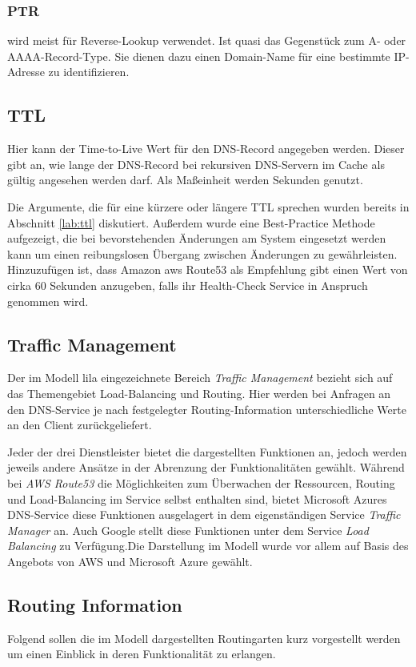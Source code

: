 \subsubsection{PTR}
wird meist für Reverse-Lookup verwendet. Ist quasi das Gegenstück zum A- oder AAAA-Record-Type. Sie dienen dazu einen Domain-Name für eine bestimmte IP-Adresse zu identifizieren.

\subsection{TTL}
Hier kann der Time-to-Live Wert für den DNS-Record angegeben werden. Dieser gibt an, wie lange der DNS-Record bei rekursiven DNS-Servern im Cache als gültig angesehen werden darf. Als Maßeinheit werden Sekunden genutzt. 

Die Argumente, die für eine kürzere oder längere TTL sprechen wurden bereits in Abschnitt \ref{lab:ttl} diskutiert. Außerdem wurde eine Best-Practice Methode aufgezeigt, die bei bevorstehenden Änderungen am System eingesetzt werden kann um einen reibungslosen Übergang zwischen Änderungen zu gewährleisten. Hinzuzufügen ist, dass Amazon aws Route53 als Empfehlung gibt einen Wert von cirka 60 Sekunden anzugeben, falls ihr Health-Check Service in Anspruch genommen wird.


\subsection{Traffic Management}
Der im Modell lila eingezeichnete Bereich \textit{Traffic Management} bezieht sich auf das Themengebiet Load-Balancing und Routing. Hier werden bei Anfragen an den DNS-Service je nach festgelegter Routing-Information unterschiedliche Werte an den Client zurückgeliefert. 

Jeder der drei Dienstleister bietet die dargestellten Funktionen an, jedoch werden jeweils andere Ansätze in der Abrenzung der Funktionalitäten gewählt. Während bei \textit{AWS Route53} die Möglichkeiten zum Überwachen der Ressourcen, Routing und Load-Balancing im Service selbst enthalten sind, bietet Microsoft Azures DNS-Service diese Funktionen ausgelagert in dem eigenständigen Service \textit{Traffic Manager} an. Auch Google stellt diese Funktionen unter dem Service \textit{Load Balancing} zu Verfügung.Die Darstellung im Modell wurde vor allem auf Basis des Angebots von AWS und Microsoft Azure gewählt.

\subsection{Routing Information}
Folgend sollen die im Modell dargestellten Routingarten kurz vorgestellt werden um einen Einblick in deren Funktionalität zu erlangen.


